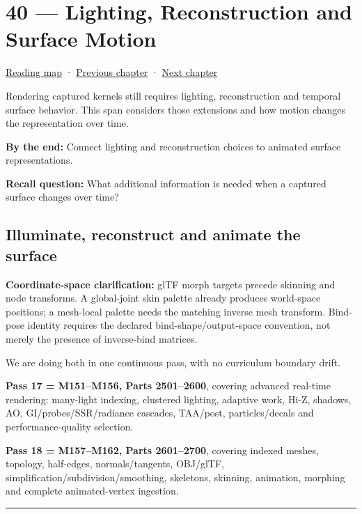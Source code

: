 \hypertarget{04-visual-computing-ii-ch040}{}
\section{40 --- Lighting, Reconstruction and Surface Motion}\label{lighting-reconstruction-and-surface-motion}

\href{Chapter\%20Edition/02\%20-\%20Graphics\%20Vision\%20and\%20XR/00\%20-\%20Reading\%20Map}{Reading map} · \hyperref[04-visual-computing-ii-ch039]{Previous chapter} · \hyperref[04-visual-computing-ii-ch041]{Next chapter}

Rendering captured kernels still requires lighting, reconstruction and temporal surface behavior. This span considers those extensions and how motion changes the representation over time.

\textbf{By the end:} Connect lighting and reconstruction choices to animated surface representations.

\textbf{Recall question:} What additional information is needed when a captured surface changes over time?

\subsection{Illuminate, reconstruct and animate the surface}\label{illuminate-reconstruct-and-animate-the-surface}

\textbf{Coordinate-space clarification:} glTF morph targets precede skinning and node transforms. A global-joint skin palette already produces world-space positions; a mesh-local palette needs the matching inverse mesh transform. Bind-pose identity requires the declared bind-shape/output-space convention, not merely the presence of inverse-bind matrices.

We are doing both in one continuous pass, with no curriculum boundary drift.

\textbf{Pass 17 = M151--M156, Parts 2501--2600}, covering advanced real-time rendering: many-light indexing, clustered lighting, adaptive work, Hi-Z, shadows, AO, GI/probes/SSR/radiance cascades, TAA/post, particles/decals and performance-quality selection.

\textbf{Pass 18 = M157--M162, Parts 2601--2700}, covering indexed meshes, topology, half-edges, normals/tangents, OBJ/glTF, simplification/subdivision/smoothing, skeletons, skinning, animation, morphing and complete animated-vertex ingestion.

\begin{center}\rule{0.5\linewidth}{0.5pt}\end{center}


